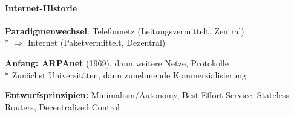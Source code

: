 \paragraph{Internet-Historie}
\begin{items}
	\item \textbf{Paradigmenwechsel}: Telefonnetz (Leitungsvermittelt, Zentral)\\* $\Rightarrow$ Internet (Paketvermittelt, Dezentral)
	
	\item \textbf{Anfang: ARPAnet} (1969), dann weitere Netze, Protokolle\\* 
		Zunächst Universitäten, dann zunehmende Kommerzialisierung
	\item \textbf{Entwurfsprinzipien:} Minimalism/Autonomy, Best Effort Service, Stateless Routers, Decentralized Control
\end{items}